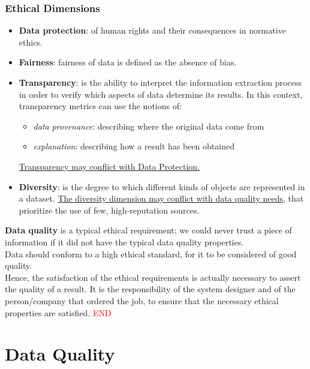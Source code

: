 \documentclass[10pt,a4paper]{article}
\begin{document}
\begin{justify}
\subsubsection{Ethical Dimensions}
\begin{itemize}
	\item \textbf{Data protection}: of human rights and their consequences in normative ethics.
	\item \textbf{Fairness}: fairness of data is defined as the absence of bias.
	\item \textbf{Transparency}: is the ability to interpret the information extraction process in order to
verify which aspects of data determine its results. In this context, transparency metrics can use the notions of:
\begin{itemize}
	\item \textit{data provenance}: describing where the original data come from
	\item \textit{explanation}: describing how a result has been obtained
\end{itemize}
	\uline{Transparency may conflict with Data Protection.}
	\item \textbf{Diversity}: is the degree to which different kinds of objects are represented in a dataset. \uline{The diversity dimension may conflict with data quality needs}, that prioritize the use of few, high-reputation sources.
\end{itemize}
\textbf{Data quality} is a typical ethical requirement: we could never trust a piece of information if it did not have the typical data quality properties. \\ Data should conform to a high ethical standard, for it to be considered of good quality. \\
Hence, the satisfaction of the ethical requirements is actually necessary to assert the quality of a result. It is the responsibility of the system designer and of the person/company that ordered the job, to ensure that the necessary ethical properties are satisfied.
\textcolor{red}{END}
\pagebreak
\section{Data Quality}

\end{justify}
\end{document}
